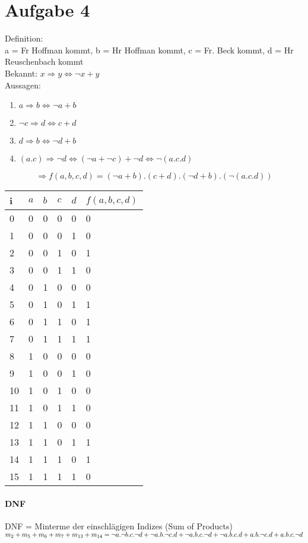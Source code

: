 \section{Aufgabe 4}
Definition: \\
a = Fr Hoffman kommt, b = Hr Hoffman kommt, c = Fr. Beck kommt, d = Hr Reuschenbach kommt\\
Bekannt: $x \Rightarrow y \Longleftrightarrow \neg x + y$\\
Aussagen: 
\begin{enumerate}
 \item $a \Rightarrow b \Longleftrightarrow \neg a + b$ 
 \item $\neg c \Rightarrow d \Longleftrightarrow c + d$
 \item $d \Rightarrow b \Longleftrightarrow \neg d + b$
 \item $(a.c) \Rightarrow \neg d \Longleftrightarrow (\neg a+\neg c) + \neg d \Longleftrightarrow \neg (a.c.d)$
\end{enumerate}

\[\Longrightarrow f(a,b,c,d)= (\neg a+b).(c+d).(\neg d+b).(\neg (a.c.d))\]
\begin{tabular}{|l||l|l|l|l||l|}\hline
i & $a$ & $b$ & $c$ & $d$ & $f(a,b,c,d)$ \\\hline\hline
0 & 0 & 0 & 0 & 0 & 0 \\\hline
1 & 0 & 0 & 0 & 1 & 0 \\\hline
2 & 0 & 0 & 1 & 0 & 1 \\\hline
3 & 0 & 0 & 1 & 1 & 0 \\\hline
4 & 0 & 1 & 0 & 0 & 0 \\\hline
5 & 0 & 1 & 0 & 1 & 1 \\\hline
6 & 0 & 1 & 1 & 0 & 1 \\\hline
7 & 0 & 1 & 1 & 1 & 1 \\\hline
8 & 1 & 0 & 0 & 0 & 0 \\\hline
9 & 1 & 0 & 0 & 1 & 0 \\\hline
10 & 1 & 0 & 1 & 0 & 0 \\\hline
11 & 1 & 0 & 1 & 1 & 0 \\\hline
12 & 1 & 1 & 0 & 0 & 0 \\\hline
13 & 1 & 1 & 0 & 1 & 1 \\\hline
14 & 1 & 1 & 1 & 0 & 1 \\\hline
15 & 1 & 1 & 1 & 1 & 0 \\\hline
\end{tabular}

\paragraph{DNF}
DNF = Minterme der einschlägigen Indizes (Sum of Products)\\
$m_2 + m_5 + m_6 + m_7 + m_{13} + m_{14} = \\
 \neg a.\neg b.c.\neg d + \neg a.b.\neg c.d + \neg a.b.c.\neg d + \neg a.b.c.d + a.b.\neg c.d + a.b.c.\neg d$

